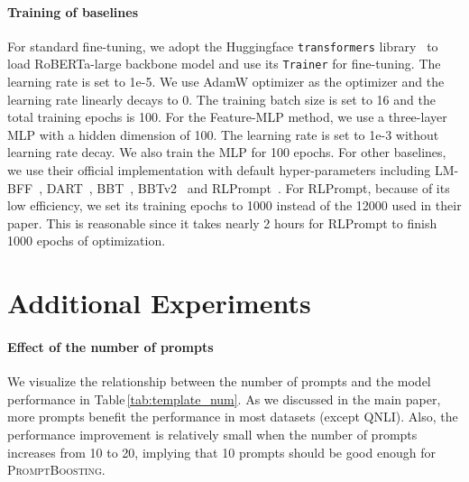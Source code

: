 \documentclass{article}
\theoremstyle{plain}
\theoremstyle{definition}
\theoremstyle{remark}
\newcommand{\alg}{\textsc{PromptBoosting}}
\begin{document}
\paragraph{Training of baselines} For standard fine-tuning, we adopt the Huggingface \texttt{transformers} library~\citep{wolf2019huggingface} to load RoBERTa-large backbone model and use its \texttt{Trainer} for fine-tuning. The learning rate is set to 1e-5. We use AdamW optimizer as the optimizer and the learning rate linearly decays to 0. The training batch size is set to 16 and the total training epochs is 100. For the Feature-MLP method, we use a three-layer MLP with a hidden dimension of 100. The learning rate is set to 1e-3 without learning rate decay. We also train the MLP for 100 epochs. For other baselines, we use their official implementation with default hyper-parameters including LM-BFF~\citep{gao2021making}, DART~\citep{zhang2021differentiable}, BBT~\citep{sun2022bbt}, BBTv2~\citep{sun2022bbtv2} and RLPrompt~\citep{deng2022rlprompt}. For RLPrompt, because of its low efficiency, we set its training epochs to 1000 instead of the 12000 used in their paper. This is reasonable since it takes nearly 2 hours for RLPrompt to finish 1000 epochs of optimization.

\section{Additional Experiments}
\label{sec: addtion_exp}

\paragraph{Effect of the number of prompts}
We visualize the relationship between the number of prompts and the model performance in Table\,\ref{tab:template_num}. As we discussed in the main paper, more prompts benefit the performance in most datasets (except QNLI). Also, the performance improvement is relatively small when the number of prompts increases from 10 to 20, implying that 10 prompts should be good enough for {\alg}.
\end{document}
